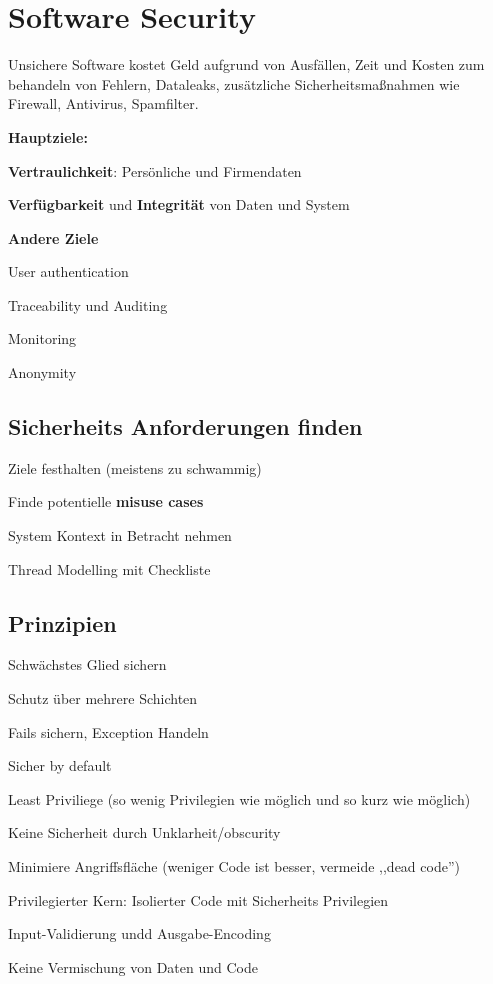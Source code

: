 
\chapter{Software Security}

Unsichere Software kostet Geld aufgrund von Ausfällen, Zeit und Kosten zum behandeln von Fehlern,
Dataleaks, zusätzliche Sicherheitsmaßnahmen wie Firewall, Antivirus, Spamfilter.

\textbf{Hauptziele:}
\begin{compactitem}
    \item \textbf{Vertraulichkeit}: Persönliche und Firmendaten
    \item \textbf{Verfügbarkeit} und \textbf{Integrität} von Daten und System
\end{compactitem}
\textbf{Andere Ziele}
\begin{compactitem}
    \item User authentication
    \item Traceability und Auditing
    \item Monitoring
    \item Anonymity
\end{compactitem}

\section{Sicherheits Anforderungen finden}
\begin{compactitem}
    \item Ziele festhalten (meistens zu schwammig)
    \item Finde potentielle \textbf{misuse cases}
    \item System Kontext in Betracht nehmen
    \item Thread Modelling mit Checkliste
\end{compactitem}

\section{Prinzipien}
\begin{compactenum}
    \item Schwächstes Glied sichern
    \item Schutz über mehrere Schichten
    \item Fails sichern, Exception Handeln
    \item Sicher by default
    \item Least Priviliege (so wenig Privilegien wie möglich und so kurz wie möglich)
    \item Keine Sicherheit durch Unklarheit/obscurity
    \item Minimiere Angriffsfläche (weniger Code ist besser, vermeide ,,dead code'')
    \item Privilegierter Kern: Isolierter Code mit Sicherheits Privilegien
    \item Input-Validierung undd Ausgabe-Encoding
    \item Keine Vermischung von Daten und Code
\end{compactenum}

